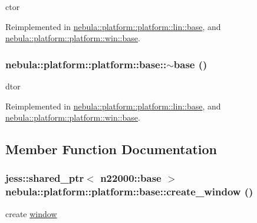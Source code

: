 ctor 

Reimplemented in \hyperlink{classnebula_1_1platform_1_1platform_1_1lin_1_1base_a38e8ff4fedc0399fc7468a996e35980d}{nebula::platform::platform::lin::base}, and \hyperlink{classnebula_1_1platform_1_1platform_1_1win_1_1base_a80a1eae8a99db4680430cd473a4be9e7}{nebula::platform::platform::win::base}.\hypertarget{classnebula_1_1platform_1_1platform_1_1base_af06e978c1a4676fb040758a35a8c2ea1}{
\subsubsection[{$\sim$base}]{\setlength{\rightskip}{0pt plus 5cm}nebula::platform::platform::base::$\sim$base ()}}
\label{classnebula_1_1platform_1_1platform_1_1base_af06e978c1a4676fb040758a35a8c2ea1}


dtor 

Reimplemented in \hyperlink{classnebula_1_1platform_1_1platform_1_1lin_1_1base_ad8bab5e66dd9f92205ec2585c49df4e0}{nebula::platform::platform::lin::base}, and \hyperlink{classnebula_1_1platform_1_1platform_1_1win_1_1base_ae3b97a8472033fe4b4067a783c440c18}{nebula::platform::platform::win::base}.

\subsection{Member Function Documentation}
\hypertarget{classnebula_1_1platform_1_1platform_1_1base_a3ea2aaff05ce1406a0fd0e72bdc7074c}{
\subsubsection[{create\_\-window}]{\setlength{\rightskip}{0pt plus 5cm}jess::shared\_\-ptr$<$ {\bf n22000::base} $>$ nebula::platform::platform::base::create\_\-window ()}}
\label{classnebula_1_1platform_1_1platform_1_1base_a3ea2aaff05ce1406a0fd0e72bdc7074c}


create \hyperlink{namespacenebula_1_1platform_1_1window}{window} 

